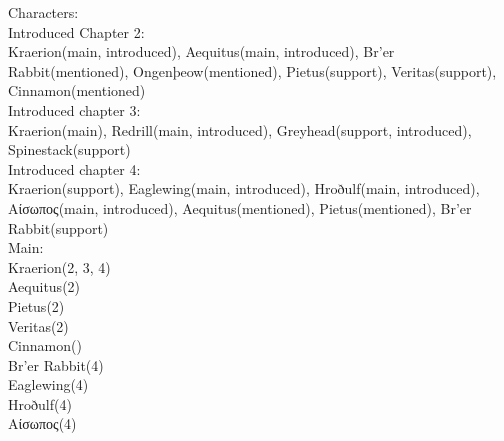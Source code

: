 



Characters:\\[1cm]
Introduced Chapter 2:\\[0.1cm]
Kraerion(main, introduced),
Aequitus(main, introduced),
Br'er Rabbit(mentioned),
Ongenþeow(mentioned),
Pietus(support),
Veritas(support),
Cinnamon(mentioned)\\[0.1cm]

Introduced chapter 3:\\[0.1cm]
Kraerion(main),
Redrill(main, introduced),
Greyhead(support, introduced),
Spinestack(support)\\[1cm]

Introduced chapter 4:\\[0.1cm]
Kraerion(support),
Eaglewing(main, introduced), 
Hroðulf(main, introduced), 
Αίσωπος(main, introduced),
Aequitus(mentioned),
Pietus(mentioned),
Br'er Rabbit(support)
\\[0.1cm]
Main: \\[0.1cm]
Kraerion(2, 3, 4)\\
Aequitus(2)\\
Pietus(2)\\
Veritas(2)\\
Cinnamon()\\
Br'er Rabbit(4)\\
Eaglewing(4)\\
Hroðulf(4)\\
Αίσωπος(4)\\
 \\[0.1cm]